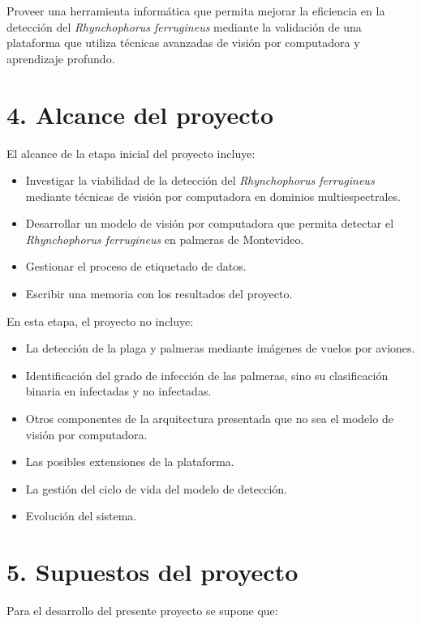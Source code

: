 \documentclass[
11pt, %
]{charter}
\begin{document}
Proveer una herramienta informática que permita mejorar la eficiencia en la detección del \textit{Rhynchophorus ferrugineus} mediante la validación de una plataforma que utiliza técnicas avanzadas de visión por computadora y aprendizaje profundo.

\section{4. Alcance del proyecto}
\label{sec:alcance}

El alcance de la etapa inicial del proyecto incluye:
\begin{itemize}
  \item Investigar la viabilidad de la detección del \textit{Rhynchophorus ferrugineus} mediante técnicas de visión por computadora en dominios multiespectrales.
  \item Desarrollar un modelo de visión por computadora que permita detectar el \textit{Rhynchophorus ferrugineus} en palmeras de Montevideo.
  \item Gestionar el proceso de etiquetado de datos.
  \item Escribir una memoria con los resultados del proyecto.
\end{itemize}

En esta etapa, el proyecto no incluye:
\begin{itemize}
  \item La detección de la plaga y palmeras mediante imágenes de vuelos por aviones.
  \item Identificación del grado de infección de las palmeras, sino su clasificación binaria en infectadas y no infectadas.
  \item Otros componentes de la arquitectura presentada que no sea el modelo de visión por computadora.
  \item Las posibles extensiones de la plataforma.
  \item La gestión del ciclo de vida del modelo de detección.
  \item Evolución del sistema.
\end{itemize}

\section{5. Supuestos del proyecto}
\label{sec:supuestos}


Para el desarrollo del presente proyecto se supone que:
\end{document}
